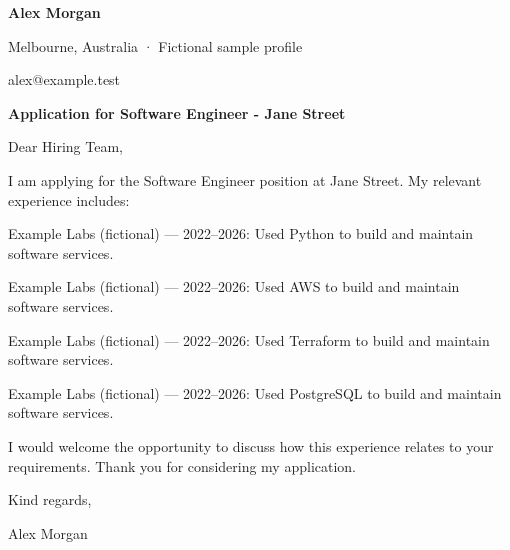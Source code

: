 \documentclass[10pt,a4paper]{article}
\begin{document}
{\LARGE\bfseries\color{navy} Alex Morgan}\par
Melbourne, Australia · Fictional sample profile\par
alex@example.test\par
{\large\bfseries\color{navy} Application for Software Engineer - Jane Street}\par
Dear Hiring Team,\par
I am applying for the Software Engineer position at Jane Street. My relevant experience includes:\par
Example Labs (fictional) — 2022–2026: Used Python to build and maintain software services.\par
Example Labs (fictional) — 2022–2026: Used AWS to build and maintain software services.\par
Example Labs (fictional) — 2022–2026: Used Terraform to build and maintain software services.\par
Example Labs (fictional) — 2022–2026: Used PostgreSQL to build and maintain software services.\par
I would welcome the opportunity to discuss how this experience relates to your requirements. Thank you for considering my application.\par
Kind regards,\par
Alex Morgan\par
\end{document}
